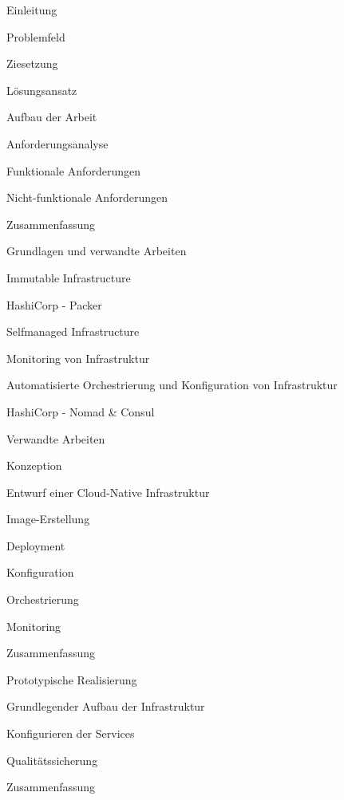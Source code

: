 \documentclass[11pt]{scrartcl}
\begin{document}
\begin{gliederung}
	\item Einleitung
	\begin{gliederung}
		\item Problemfeld
		\item Ziesetzung
		\item Lösungsansatz
		\item Aufbau der Arbeit
	\end{gliederung}

	\item Anforderungsanalyse
	\begin{gliederung}
		\item Funktionale Anforderungen
		\item Nicht-funktionale Anforderungen
		\item Zusammenfassung
	\end{gliederung}
	
	\item Grundlagen und verwandte Arbeiten
	\begin{gliederung}
		\item Immutable Infrastructure
			\item HashiCorp - Packer
		\item Selfmanaged Infrastructure
		\item Monitoring von Infrastruktur
		\item Automatisierte Orchestrierung und Konfiguration von Infrastruktur
			\item HashiCorp - Nomad \& Consul
		\item Verwandte Arbeiten
	\end{gliederung}
	
	\item Konzeption
	\begin{gliederung}
		\item Entwurf einer Cloud-Native Infrastruktur
		\begin{gliederung}
			\item Image-Erstellung
			\item Deployment
			\item Konfiguration
			\item Orchestrierung
			\item Monitoring
		\end{gliederung}
		\item Zusammenfassung
	\end{gliederung}
	
	\item Prototypische Realisierung
	\begin{gliederung}
		\item Grundlegender Aufbau der Infrastruktur
		\item Konfigurieren der Services
		\end{gliederung}
		\item Qualitätssicherung
		\item Zusammenfassung
	\end{gliederung}
\end{document}

